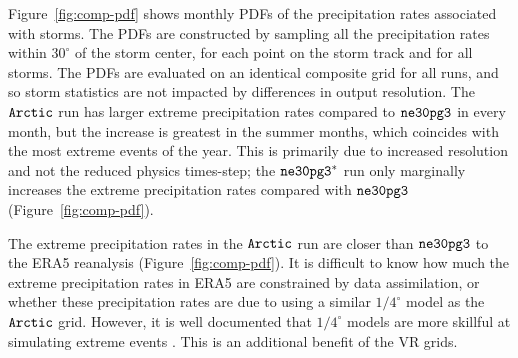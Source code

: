 \documentclass[draft]{agujournal2019}
\begin{document}
Figure~\ref{fig:comp-pdf} shows monthly PDFs of the precipitation rates associated with storms. The PDFs are constructed by sampling all the precipitation rates within $30^{\circ}$ of the storm center, for each point on the storm track and for all storms. The PDFs are evaluated on an identical composite grid for all runs, and so storm statistics are not impacted by differences in output resolution. The $\tt Arctic$ run has larger extreme precipitation rates compared to $\tt ne30pg3$ in every month, but the increase is greatest in the summer months, which coincides with the most extreme events of the year. This is primarily due to increased resolution and not the reduced physics times-step; the $\tt ne30pg3^{*}$ run only marginally increases the extreme precipitation rates compared with $\tt ne30pg3$ (Figure~\ref{fig:comp-pdf}).

The extreme precipitation rates in the $\tt Arctic$ run are closer than $\tt ne30pg3$ to the ERA5 reanalysis (Figure~\ref{fig:comp-pdf}). It is difficult to know how much the extreme precipitation rates in ERA5 are constrained by data assimilation, or whether these precipitation rates are due to using a similar $1/4^{\circ}$ model as the $\tt Arctic$ grid. However, it is well documented that $1/4^{\circ}$ models are more skillful at simulating extreme events \cite{BetAl2013JC,OETAL2016JAMES}.  This is an additional benefit of the VR grids.
\end{document}
